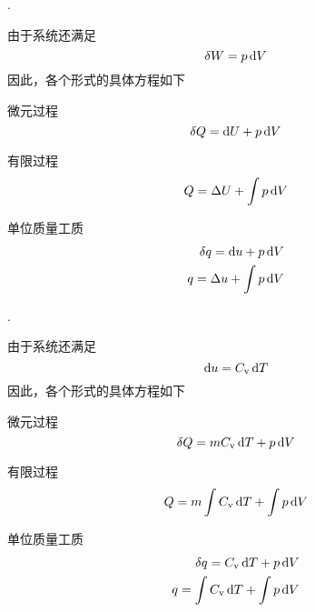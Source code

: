 . \dya[简单可压缩静止封闭系统的可逆过程]\rgap
\par 由于系统还满足
\begin{equation}
	\delta W =p \,{\rm{d}} V
\end{equation}
因此，各个形式的具体方程如下
\begin{myitemize}
	\item 微元过程
\begin{equation}
	\delta Q ={\rm{d}} U +p \,{\rm{d}} V
\end{equation}
\item 有限过程
\begin{equation}
	Q = \Delta U + \int p \,{\rm{d}} V
\end{equation}
\item 单位质量工质
\begin{equation}
	\begin{split}
		\displaystyle \delta q = {\rm{d}} u + p \,{\rm{d}} V\\
		\displaystyle q = \Delta u + \int p \,{\rm{d}} V
	\end{split}
\end{equation}
\end{myitemize}

\vspace*{1em}

. \dya[工质为理想气体的可压缩静止封闭系统的可逆过程]\rgap
\par 由于系统还满足
\begin{equation}
	 {\rm{d}} u = C_{\text{v}} \,{\rm{d}} T
\end{equation}
因此，各个形式的具体方程如下
\begin{myitemize}
	\item 微元过程
	\begin{equation}
		\delta Q = m C_{\text{v}} \,{\rm{d}} T+p \,{\rm{d}} V
	\end{equation}
	\item 有限过程
	\begin{equation}
		Q = m \int C_{\text{v}} \,{\rm{d}} T + \int p \,{\rm{d}} V
	\end{equation}
	\item 单位质量工质
	\begin{equation}
		\begin{split}
			\displaystyle \delta q = C_{\text{v}} \,{\rm{d}} T + p \,{\rm{d}} V\\
			\displaystyle q = \int C_{\text{v}} \,{\rm{d}} T + \int p \,{\rm{d}} V
		\end{split}
	\end{equation}
\end{myitemize}

